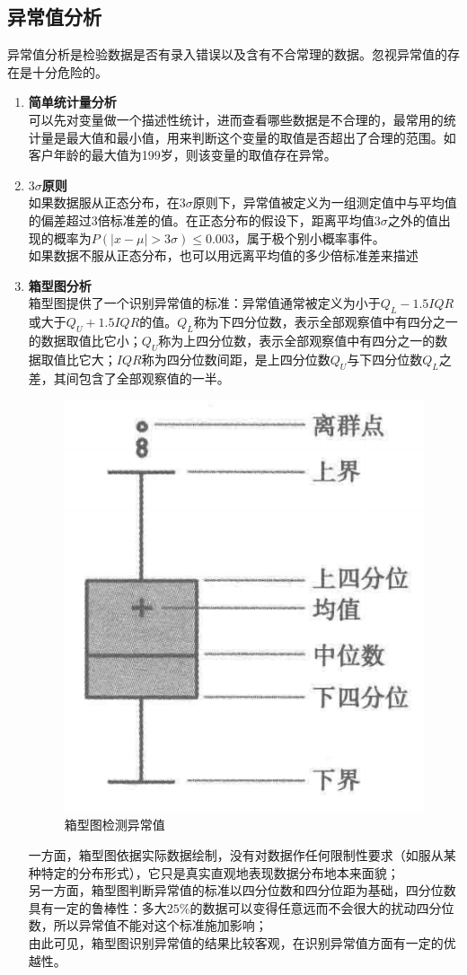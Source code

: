 \documentclass[openany]{progbookcn}
\begin{document}
\subsection{异常值分析}
\indent 异常值分析是检验数据是否有录入错误以及含有不合常理的数据。忽视异常值的存在是十分危险的。
\begin{enumerate}
    \item {\bf 简单统计量分析}\\
    \indent \indent 可以先对变量做一个描述性统计，进而查看哪些数据是不合理的，最常用的统计量是最大值和最小值，用来判断这个变量的取值是否超出了合理的范围。如客户年龄的最大值为199岁，则该变量的取值存在异常。
    \item {\bf $3\sigma$原则}\\
    \indent \indent 如果数据服从正态分布，在$3\sigma$原则下，异常值被定义为一组测定值中与平均值的偏差超过$3$倍标准差的值。在正态分布的假设下，距离平均值$3\sigma$之外的值出现的概率为$P(|x-\mu|>3\sigma)\le0.003$，属于极个别小概率事件。\\
    \indent \indent 如果数据不服从正态分布，也可以用远离平均值的多少倍标准差来描述
    \item {\bf 箱型图分析}\\
    \indent \indent 箱型图提供了一个识别异常值的标准：异常值通常被定义为小于$Q_L-1.5IQR$或大于$Q_U+1.5IQR$的值。$Q_L$称为下四分位数，表示全部观察值中有四分之一的数据取值比它小；$Q_U$称为上四分位数，表示全部观察值中有四分之一的数据取值比它大；$IQR$称为四分位数间距，是上四分位数$Q_U$与下四分位数$Q_L$之差，其间包含了全部观察值的一半。
    \begin{figure}[H]
        \centering
        \includegraphics[width=0.3 \textwidth]{figs/chapter23/箱型图检测异常值}
        \caption{箱型图检测异常值}
    \end{figure}
    \indent \indent 一方面，箱型图依据实际数据绘制，没有对数据作任何限制性要求（如服从某种特定的分布形式），它只是真实直观地表现数据分布地本来面貌；\\
    \indent \indent 另一方面，箱型图判断异常值的标准以四分位数和四分位距为基础，四分位数具有一定的鲁棒性：多大$25\%$的数据可以变得任意远而不会很大的扰动四分位数，所以异常值不能对这个标准施加影响；\\
    \indent \indent 由此可见，箱型图识别异常值的结果比较客观，在识别异常值方面有一定的优越性。
\end{enumerate}
\end{document}
